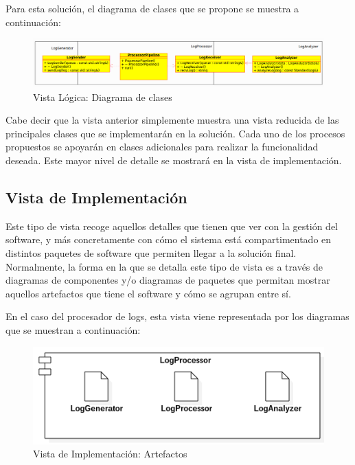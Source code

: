 \documentclass[11pt]{article}
\begin{document}
Para esta solución, el diagrama de clases que se propone se muestra a continuación:

\begin{center}
 \begin{figure}[H]
 \begin{center}
   \includegraphics[width=15cm]{img/classes_summary01.png}
   \caption{Vista Lógica: Diagrama de clases}
   \label{fig:4plus1views}
 \end{center}
 \end{figure}
\end{center}

Cabe decir que la vista anterior simplemente muestra una vista reducida de las principales clases que se implementarán en la solución. Cada uno de los procesos propuestos se apoyarán en clases adicionales para realizar la funcionalidad deseada. Este mayor nivel de detalle se mostrará en la vista de implementación.

\subsection{Vista de Implementación}

Este tipo de vista recoge aquellos detalles que tienen que ver con la gestión del software, y más concretamente con cómo el sistema está compartimentado en distintos paquetes de software que permiten llegar a la solución final. Normalmente, la forma en la que se detalla este tipo de vista es a través de diagramas de componentes y/o diagramas de paquetes que permitan mostrar aquellos artefactos que tiene el software y cómo se agrupan entre sí.

En el caso del procesador de logs, esta vista viene representada por los diagramas que se muestran a continuación:

\begin{center}
 \begin{figure}[H]
 \begin{center}
   \includegraphics[width=15cm]{img/implementation_view00.png}
   \caption{Vista de Implementación: Artefactos}
   \label{fig:4plus1views}
 \end{center}
 \end{figure}
\end{center}
\end{document}
